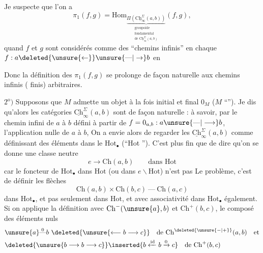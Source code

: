 Je suspecte que l'on a
\[
\pi_1(f,g)=\mathrm{Hom}_{\underbrace{\Pi(\mathrm{C}\underline{\mathrm{h}}_{\infty}^{\Sigma}(a,b))}_{\substack{\text{groupoïde}\\\text{fondamental}\\\text{de }\mathrm{C}\underline{\mathrm{h}}_{\infty}^{\Sigma}(a,b)}}}(f,g),
\]
quand $f$ et $g$ sont considérés comme des ``chemins infinis'' en  chaque $f:a\deleted{\unsure{\leftarrow}}\unsure{\text{---}|\to}b$ en

Donc la définition des $\pi_1(f,g)$  se prolonge de façon naturelle aux chemins infinis ( finis) arbitraires.

$2^{\mathrm o})$ Supposons que $M$ admette un objet à la fois initial et final $0_M$ ($M$ ``''). Je dis qu'alors  les catégories $\underline{\mathrm{Ch}}_{\infty}^{\Sigma}(a,b)$ sont  de façon naturelle : à savoir, par le chemin infini de $a$ à $b$ défini  à partir de $f=0_{a,b}:a\unsure{\text{---}|\longrightarrow}b$, l'application nulle de $a$ à $b$, On  a envie alors de regarder les $\underline{\mathrm{Ch}}_{\infty}^{\Sigma}(a,b)$ comme définissant des éléments dans le $\mathrm{Hot}_{\bullet}$ (``Hot ''). C'est plus fin que de dire qu'on se donne une classe neutre
\[
e\longrightarrow\mathrm{Ch}(a,b)\qquad\text{dans Hot}
\]
car le foncteur de $\mathrm{Hot}_{\bullet}$ dans $\mathrm{Hot}$ (ou dans $e\backslash\mathrm{Hot}$) n'est pas  Le problème, c'est de définir les flèches
\[
\mathrm{Ch}(a,b)\times\mathrm{Ch}(b,c)\ \text{---}\ \mathrm{Ch}(a,c)
\]
dans $\mathrm{Hot}_{\bullet}$, et pas seulement dans $\mathrm{Hot}$, et avec associativité  dans $\mathrm{Hot}_{\bullet}$ également. Si on applique la définition avec $\mathrm{Ch}^{-}(\unsure{a},b)$ et $\mathrm{Ch}^{+}(b,c)$, le composé des éléments nuls
\[
\begin{aligned}
&\unsure{a}\overset{0}{\text{---}}b\ \deleted{\unsure{\longleftarrow b\longrightarrow c}}\quad\text{de }\mathrm{Ch}^{\deleted{\unsure{-|+}}}(a,b)\quad\text{et}\\
&\deleted{\unsure{b\longrightarrow b\longrightarrow c}}\inserted{b\xleftarrow{\mathrm{id}}b\xrightarrow{0}c}\quad\text{de }\mathrm{Ch}^{+}(b,c)
\end{aligned}
\]

